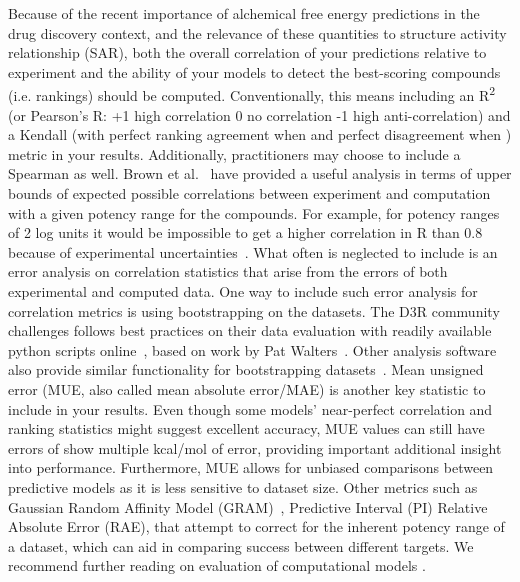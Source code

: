 \documentclass[9pt,bestpractices]{livecoms}
\begin{document}
Because of the recent importance of alchemical free energy predictions in the  drug discovery context, and the relevance of these quantities to structure activity relationship (SAR), both the overall correlation of your predictions relative to experiment and the ability of your models to detect the best-scoring compounds (i.e. rankings) should be computed. Conventionally, this means including an R\textsuperscript{2} (or Pearson's R: +1 high correlation 0 no correlation -1 high anti-correlation) and a Kendall \texttau{} (with perfect ranking agreement when  and perfect disagreement when ) metric in your results. Additionally, practitioners may choose to include a Spearman \textrho{} as well. Brown et al.~\cite{brown2009healthy} have provided a useful analysis in terms of upper bounds of expected possible correlations between experiment and computation with a given potency range for the compounds. For example, for potency ranges of 2 log units it would be impossible to get a higher correlation in R than 0.8 because of experimental uncertainties~\cite{brown2009healthy}. What often is neglected to include is an error analysis on correlation statistics that arise from the errors of both experimental and computed data. One way to include such error analysis for correlation metrics is using bootstrapping on the datasets. The D3R community challenges follows best practices on their data evaluation with readily available python scripts online~\cite{2018drugdata}, based on work by Pat Walters~\cite{walters2013what}. Other analysis software also provide similar functionality for bootstrapping datasets~\cite{antonia2019michellab}. 
%
Mean unsigned error (MUE, also called mean absolute error/MAE) is another key statistic to include in your results. Even though some models' near-perfect correlation and ranking statistics might suggest excellent accuracy, MUE values can still have errors of show multiple kcal/mol of error, providing important additional insight into performance. Furthermore, MUE allows for unbiased comparisons between predictive models as it is less sensitive to dataset size. Other metrics such as Gaussian Random Affinity Model (GRAM)~\cite{cui2019gram}, Predictive Interval (PI) Relative Absolute Error (RAE), that attempt to correct for the inherent potency range of a dataset, which can aid in comparing success between different targets. We recommend further reading on evaluation of computational models \cite{jain2008recommendations, walters2013what, brown2009healthy, walterthoughts}.
\end{document}
